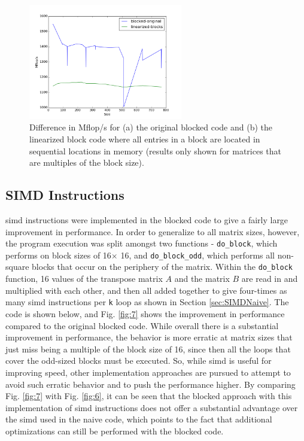 \documentclass[10pt]{article}
\begin{document}
\begin{figure}[H]
\centering
\includegraphics[width=0.6\textwidth]{figures/linearized-blocks.png}
\caption{Difference in Mflop/s for (a) the original blocked code and (b) the linearized block code where all entries in a block are located in sequential locations in memory (results only shown for matrices that are multiples of the block size).}
\label{fig:9}
\end{figure}

\subsection{SIMD Instructions} 

\gls{simd} instructions were implemented in the blocked code to give a fairly large improvement in performance. In order to generalize to all matrix sizes, however, the program execution was split amongst two functions - {\tt do\_block}, which performs on block sizes of 16\(\times\) 16, and {\tt do\_block\_odd}, which performs all non-square blocks that occur on the periphery of the matrix. Within the {\tt do\_block} function, 16 values of the transpose matrix \(A\) and the matrix \(B\) are read in and multiplied with each other, and then all added together to give four-times as many \gls{simd} instructions per {\tt k} loop as shown in Section \ref{sec:SIMDNaive}. The code is shown below, and Fig. \ref{fig:7} shows the improvement in performance compared to the original blocked code. While overall there is a substantial improvement in performance, the behavior is more erratic at matrix sizes that just miss being a multiple of the block size of 16, since then all the loops that cover the odd-sized blocks must be executed. So, while \gls{simd} is useful for improving speed, other implementation approaches are pursued to attempt to avoid such erratic behavior and to push the performance higher. By comparing Fig. \ref{fig:7} with Fig. \ref{fig:6}, it can be seen that the blocked approach with this implementation of \gls{simd} instructions does not offer a substantial advantage over the \gls{simd} used in the naive code, which points to the fact that additional optimizations can still be performed with the blocked code.
\end{document}
